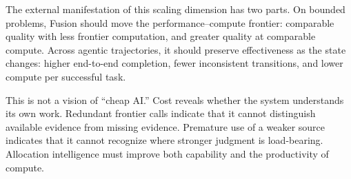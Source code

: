 The external manifestation of this scaling dimension has two parts. On bounded
problems, Fusion should move the performance--compute frontier: comparable
quality with less frontier computation, and greater quality at comparable
compute. Across agentic trajectories, it should preserve effectiveness as the
state changes: higher end-to-end completion, fewer inconsistent transitions,
and lower compute per successful task.

This is not a vision of ``cheap AI.'' Cost reveals whether the system
understands its own work. Redundant frontier calls indicate that it cannot
distinguish available evidence from missing evidence. Premature use of a weaker
source indicates that it cannot recognize where stronger judgment is
load-bearing. Allocation intelligence must improve both capability and the
productivity of compute.

